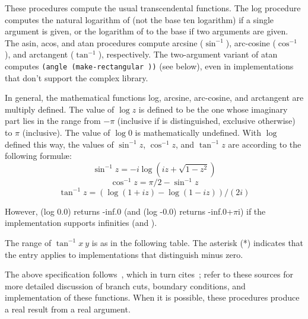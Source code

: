 \begin{entry}{%
}

These procedures 
compute the usual transcendental functions.  The {\cf log} procedure
computes the natural logarithm of  (not the base ten logarithm)
if a single argument is given, or the logarithm of  to the base
 if two arguments are given.
The {\cf asin}, {\cf acos}, and {\cf atan} procedures compute arcsine ($\sin^{-1}$),
arc-cosine ($\cos^{-1}$), and arctangent ($\tan^{-1}$), respectively.
The two-argument variant of {\cf atan} computes {\tt (angle
(make-rectangular  ))} (see below), even in implementations
that don't support the complex library.

In general, the mathematical functions log, arcsine, arc-cosine, and
arctangent are multiply defined.
The value of $\log z$ is defined to be the one whose imaginary part
lies in the range from $-\pi$ (inclusive if {} is distinguished,
exclusive otherwise) to $\pi$ (inclusive).
The value of $\log 0$ is mathematically undefined.
With $\log$ defined this way, the values of $\sin^{-1} z$, $\cos^{-1} z$,
and $\tan^{-1} z$ are according to the following formul\ae:
$$\sin^{-1} z = -i \log (i z + \sqrt{1 - z^2})$$
$$\cos^{-1} z = \pi / 2 - \sin^{-1} z$$
$$\tan^{-1} z = (\log (1 + i z) - \log (1 - i z)) / (2 i)$$

However, {\cf (log 0.0)} returns {\cf -inf.0} 
(and {\cf (log -0.0)} returns {\cf -inf.0+$\pi$i}) if the
implementation supports infinities (and {}).

The range of $\tan^{-1} x~y$ is as in the following table. The
asterisk (*) indicates that the entry applies to implementations that
distinguish minus zero.

The above specification follows~\cite{CLtL}, which in turn
cites~\cite{Penfield81}; refer to these sources for more detailed
discussion of branch cuts, boundary conditions, and implementation of
these functions.  When it is possible, these procedures produce a real
result from a real argument.


\end{entry}

